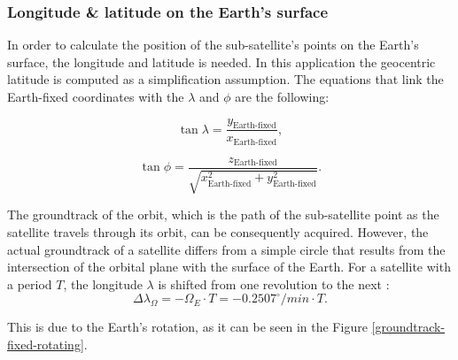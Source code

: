 \bigskip
\subsubsection{Longitude \& latitude on the Earth's surface}
\bigskip

In order to calculate the position of the sub-satellite's points on the Earth's surface, the longitude and latitude is needed. In this application the geocentric latitude is computed as a simplification assumption. The equations that link the Earth-fixed coordinates with the $\lambda$ and $\phi$ are the following:

\begin{equation}
\tan{\lambda} = \frac{y_{\text{Earth-fixed}}}{x_{\text{Earth-fixed}}},
\end{equation}

\begin{equation}
\tan{\phi} = \frac{z_{\text{Earth-fixed}}}{\sqrt{x^2_{\text{Earth-fixed}} + y^2_{\text{Earth-fixed}}}}.
\end{equation}

The groundtrack of the orbit, which is the path of the sub-satellite point as the satellite travels through its orbit, can be consequently acquired. However, the actual groundtrack of a satellite differs from a simple circle that results from the intersection of the orbital plane with the surface of the Earth. For a satellite with a period $T$, the longitude $\lambda$ is shifted from one revolution to the next \cite{Montenbruck} :
\begin{equation}
\label{delta_lambda}
\Delta \lambda_{\Omega} = - \Omega_{E} \cdot T = - 0.2507^{\circ}/ min \cdot T.
\end{equation}

This is due to the Earth's rotation, as it can be seen in the Figure \ref{groundtrack-fixed-rotating}.


